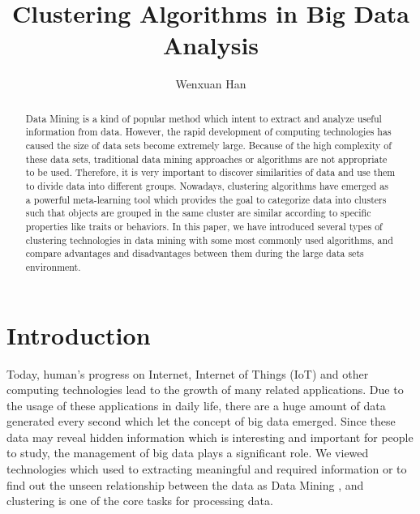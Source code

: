 \documentclass[sigconf]{acmart}
\begin{document}
\title{Clustering Algorithms in Big Data Analysis}


\author{Wenxuan Han}




\begin{abstract}
Data Mining is a kind of popular method which intent to extract and analyze useful information from data. However, the rapid development of computing technologies has caused the size of data sets become extremely large. Because of the high complexity of these data sets, traditional data mining approaches or algorithms are not appropriate to be used. Therefore, it is very important to discover similarities of data and use them to divide data into different groups. Nowadays, clustering algorithms have emerged as a powerful meta-learning tool which provides the goal to categorize data into clusters such that objects are grouped in the same cluster are similar according to specific properties like traits or behaviors. In this paper, we have introduced several types of clustering technologies in data mining with some most commonly used algorithms, and compare advantages and disadvantages between them during the large data sets environment.
\end{abstract}



\maketitle



\section{Introduction}

Today, human's progress on Internet, Internet of Things (IoT) and other computing technologies lead to the growth of many related applications. Due to the usage of these applications in daily life, there are a huge amount of data generated every second which let the concept of big data emerged. Since these data may reveal hidden information which is interesting and important for people to study, the management of big data plays a significant role. We viewed technologies which used to extracting meaningful and required information or to find out the unseen relationship between the data as Data Mining \cite{dcar}, and clustering is one of the core tasks for processing data.
\end{document}
